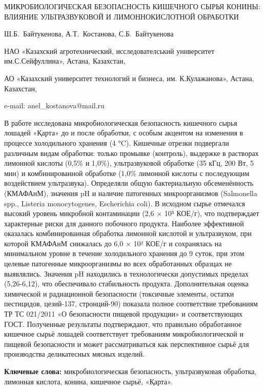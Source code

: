 \begin{header}
МИКРОБИОЛОГИЧЕСКАЯ БЕЗОПАСНОСТЬ КИШЕЧНОГО СЫРЬЯ КОНИНЫ: ВЛИЯНИЕ УЛЬТРАЗВУКОВОЙ И ЛИМОННОКИСЛОТНОЙ ОБРАБОТКИ

Ш.Б.~Байтукенова,
А.Т.~Костанова\envelope,
С.Б.~Байтукенова
\end{header}

\begin{affil}
НАО «Казахский агротехнический, исследователський университет им.С.Сейфуллина», Астана, Казахстан,

АО «Казахский университет технологий и бизнеса, им. К.Кулажанова», Астана, Казахстан,

e-mail: anel\_kostanova@mail.ru
\end{affil}

В работе исследована микробиологическая безопасность кишечного сырья
лошадей «Қарта» до и после обработки, с особым акцентом на изменения в
процессе холодильного хранения (4 °C). Кишечные отрезки подвергали
различным видам обработки: только промывке (контроль), выдержке в
растворах лимонной кислоты (0,5\% и 1,0\%), ультразвуковой обработке (35
кГц, 200 Вт, 5 мин) и комбинированной обработке (1,0\% лимонной кислоты
с последующим воздействием ультразвука). Определяли общую бактериальную
обсеменённость (КМАФАнМ), значения pH и наличие патогенных
микроорганизмов (Salmonella spp., Listeria monocytogenes, Escherichia
coli). В исходном сырье отмечался высокий уровень микробной контаминации
(2,6 × 10⁵ КОЕ/г), что подтверждает характерные риски для данного
побочного продукта. Наиболее эффективной оказалась комбинированная
обработка лимонной кислотой и ультразвуком, при которой КМАФАнМ
снижалась до 6,0 × 10² КОЕ/г и сохранялась на минимальном уровне в
течение холодильного хранения до 9 суток, при этом целевые патогенные
микроорганизмы во всех обработанных образцах не выявлялись. Значения pH
находились в технологически допустимых пределах (5,26-6,12), что
обеспечивало стабильность продукта. Дополнительная оценка химической и
радиационной безопасности (токсичные элементы, остатки пестицидов,
цезий-137, стронций-90) показала полное соответствие требованиям ТР ТС
021/2011 «О безопасности пищевой продукции» и соответствующих ГОСТ.
Полученные результаты подтверждают, что правильно обработанное кишечное
сырьё лошадей соответствует требованиям микробиологической и пищевой
безопасности и может рассматриваться как перспективное сырьё для
производства деликатесных мясных изделий.

{\bfseries Ключевые слова:} микробиологическая безопасность, ультразвуковая
обработка, лимонная кислота, конина, кишечное сырьё, «Қарта».

